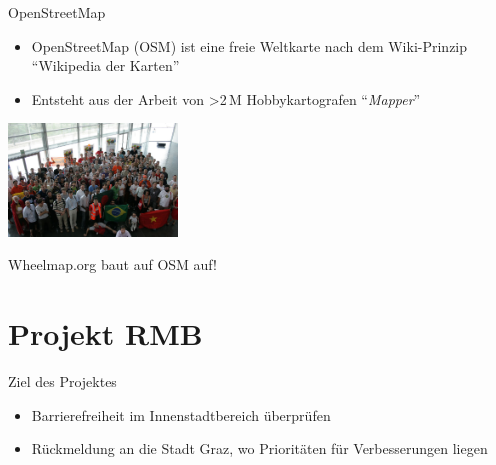 \documentclass{beamer}
\begin{document}
\begin{frame}{OpenStreetMap}


  \begin{itemize}
        \item OpenStreetMap (OSM) ist eine freie Weltkarte nach dem Wiki-Prinzip ``Wikipedia der Karten''
          \pause
            \item Entsteht aus der Arbeit von \textgreater 2\,M Hobbykartografen ``\emph{Mapper}''
          \end{itemize}

           \begin{center}
              \includegraphics[width=4.5cm]{sotm.jpg}
               \end{center}

             \pause
  Wheelmap.org baut auf OSM auf!

\end{frame}

\section{Projekt RMB}

\begin{frame}{Ziel des Projektes}

    \begin{itemize}
       \item Barrierefreiheit im Innenstadtbereich überprüfen

         \pause

      \vspace{1cm}

      \item Rückmeldung an die Stadt Graz, wo Prioritäten für Verbesserungen liegen
    \end{itemize}


\end{frame}
\end{document}
